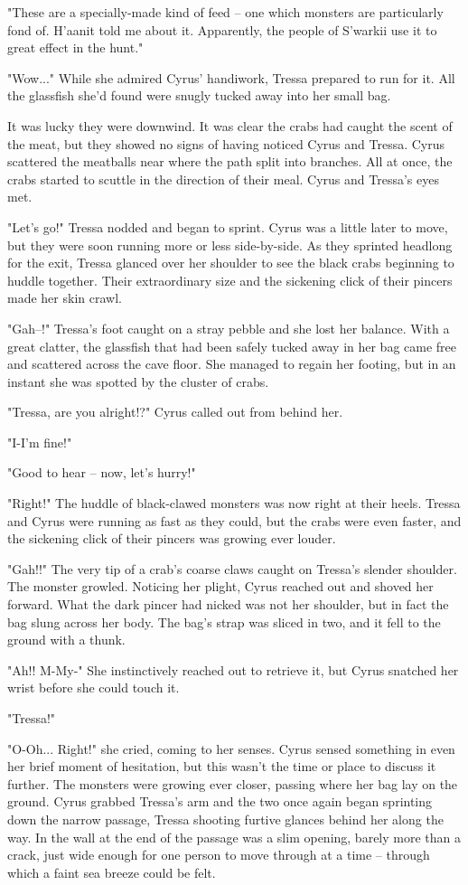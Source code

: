 "These are a specially-made kind of feed -- one which monsters are particularly fond of. H'aanit told me about it. Apparently, the people of S'warkii use it to great effect in the hunt."

"Wow..." While she admired Cyrus' handiwork, Tressa prepared to run for it. All the glassfish she'd found were snugly tucked away into her small bag.

It was lucky they were downwind. It was clear the crabs had caught the scent of the meat, but they showed no signs of having noticed Cyrus and Tressa. Cyrus scattered the meatballs near where the path split into branches. All at once, the crabs started to scuttle in the direction of their meal. Cyrus and Tressa's eyes met.

"Let's go!" Tressa nodded and began to sprint. Cyrus was a little later to move, but they were soon running more or less side-by-side. As they sprinted headlong for the exit, Tressa glanced over her shoulder to see the black crabs beginning to huddle together. Their extraordinary size and the sickening click of their pincers made her skin crawl.

"Gah--!" Tressa's foot caught on a stray pebble and she lost her balance. With a great clatter, the glassfish that had been safely tucked away in her bag came free and scattered across the cave floor. She managed to regain her footing, but in an instant she was spotted by the cluster of crabs.

"Tressa, are you alright!?" Cyrus called out from behind her.

"I-I'm fine!"

"Good to hear -- now, let's hurry!"

"Right!" The huddle of black-clawed monsters was now right at their heels. Tressa and Cyrus were running as fast as they could, but the crabs were even faster, and the sickening click of their pincers was growing ever louder.

"Gah!!" The very tip of a crab's coarse claws caught on Tressa's slender shoulder. The monster growled. Noticing her plight, Cyrus reached out and shoved her forward. What the dark pincer had nicked was not her shoulder, but in fact the bag slung across her body. The bag's strap was sliced in two, and it fell to the ground with a thunk.

"Ah!! M-My-" She instinctively reached out to retrieve it, but Cyrus snatched her wrist before she could touch it.

"Tressa!"

"O-Oh... Right!" she cried, coming to her senses. Cyrus sensed something in even her brief moment of hesitation, but this wasn't the time or place to discuss it further. The monsters were growing ever closer, passing where her bag lay on the ground. Cyrus grabbed Tressa's arm and the two once again began sprinting down the narrow passage, Tressa shooting furtive glances behind her along the way. In the wall at the end of the passage was a slim opening, barely more than a crack, just wide enough for one person to move through at a time -- through which a faint sea breeze could be felt.

